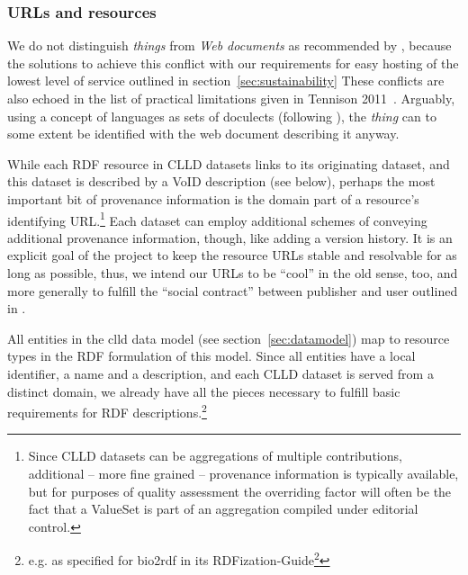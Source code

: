 \documentclass[a4paper,10pt]{article}
\begin{document}

\subsubsection{URLs and resources}
We do not distinguish \emph{things} from \emph{Web documents} as recommended by ,
because the solutions to achieve this conflict with our requirements for easy hosting of the lowest level
of service outlined in section~\ref{sec:sustainability}
These conflicts are also echoed in the list of practical limitations given in Tennison 2011~\cite{tennison2011}.
Arguably, using a concept of languages as sets of doculects (following ), the \emph{thing} can
to some extent be identified with the web document describing it anyway.

While each RDF resource in CLLD datasets links to its originating
dataset, and this dataset is described by a VoID description (see below), perhaps the most
important bit of provenance information is the domain part of
a resource's identifying URL.\footnote{Since CLLD datasets can be aggregations of multiple
contributions, additional -- more fine grained -- provenance information is typically available,
but for purposes of quality assessment the overriding factor will often be the fact that a
ValueSet is part of an aggregation compiled under editorial control.} Each dataset can employ
additional schemes of conveying additional provenance information, though, like adding a version history.
It is an explicit goal of the project to keep the resource URLs stable and resolvable for
as long as possible, thus, we intend our URLs to be ``cool'' in the old sense, too, and more
generally to fulfill the ``social contract'' between publisher and user outlined in .

All entities in the clld data model (see section~\ref{sec:datamodel}) map to resource types
in the RDF formulation of this model. Since all entities have a local identifier, a name
and a description, and each CLLD dataset is served from a distinct domain,
we already have all the pieces necessary to fulfill basic requirements for RDF
descriptions.\footnote{e.g. as specified for bio2rdf in its
RDFization-Guide\footnote{https://github.com/bio2rdf/bio2rdf-scripts/wiki/RDFization-Guide}}
\end{document}
